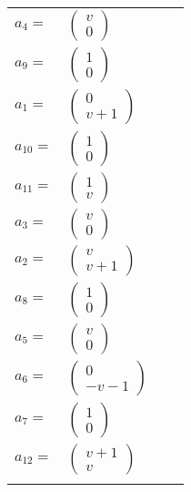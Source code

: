 \documentclass[1p]{elsarticle_modified}
\theoremstyle{definition}
\begin{document}
\begin{tabular}{m{7pt} m{180pt} m{7pt} m{180pt} }
\flushright $a_{4}=$&$\begin{pmatrix}v\\0\end{pmatrix}$ \\
\flushright $a_{9}=$&$\begin{pmatrix}1\\0\end{pmatrix}$ \\
\flushright $a_{1}=$&$\begin{pmatrix}0\\v+1\end{pmatrix}$ \\
\flushright $a_{10}=$&$\begin{pmatrix}1\\0\end{pmatrix}$ \\
\flushright $a_{11}=$&$\begin{pmatrix}1\\v\end{pmatrix}$ \\
\flushright $a_{3}=$&$\begin{pmatrix}v\\0\end{pmatrix}$ \\
\flushright $a_{2}=$&$\begin{pmatrix}v\\v+1\end{pmatrix}$ \\
\flushright $a_{8}=$&$\begin{pmatrix}1\\0\end{pmatrix}$ \\
\flushright $a_{5}=$&$\begin{pmatrix}v\\0\end{pmatrix}$ \\
\flushright $a_{6}=$&$\begin{pmatrix}0\\- v-1\end{pmatrix}$ \\
\flushright $a_{7}=$&$\begin{pmatrix}1\\0\end{pmatrix}$ \\
\flushright $a_{12}=$&$\begin{pmatrix}v+1\\v\end{pmatrix}$\\&\end{tabular}
\end{document}
